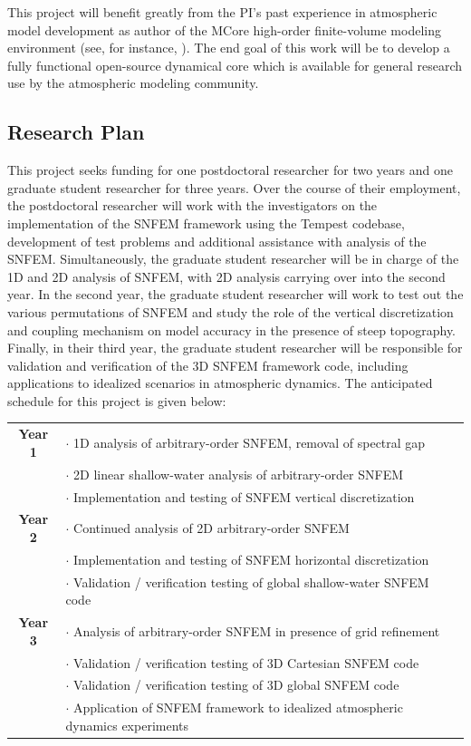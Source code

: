 \documentclass[11pt]{article}
\begin{document}
This project will benefit greatly from the PI's past experience in atmospheric model development as author of the MCore high-order finite-volume modeling environment (see, for instance, \cite{PAUCJBVL2010JCP,PAUCJ2012MWR,PAUCJ2012JCP}).  The end goal of this work will be to develop a fully functional open-source dynamical core which is available for general research use by the atmospheric modeling community.

\subsection{Research Plan} \label{sec:ResearchPlan}

This project seeks funding for one postdoctoral researcher for two years and one graduate student researcher for three years.  Over the course of their employment, the postdoctoral researcher will work with the investigators on the implementation of the SNFEM framework using the Tempest codebase, development of test problems and additional assistance with analysis of the SNFEM.  Simultaneously, the graduate student researcher will be in charge of the 1D and 2D analysis of SNFEM, with 2D analysis carrying over into the second year.  In the second year, the graduate student researcher will work to test out the various permutations of SNFEM and study the role of the vertical discretization and coupling mechanism on model accuracy in the presence of steep topography.  Finally, in their third year, the graduate student researcher will be responsible for validation and verification of the 3D SNFEM framework code, including applications to idealized scenarios in atmospheric dynamics.  The anticipated schedule for this project is given below:

\begin{tabularx}{\textwidth}{cX}
\hline
\textbf{Year 1} & $\cdot$ 1D analysis of arbitrary-order SNFEM, removal of spectral gap \\
& $\cdot$ 2D linear shallow-water analysis of arbitrary-order SNFEM \\
& $\cdot$ Implementation and testing of SNFEM vertical discretization \\
\hline
\textbf{Year 2} & $\cdot$ Continued analysis of 2D arbitrary-order SNFEM \\
& $\cdot$ Implementation and testing of SNFEM horizontal discretization \\
& $\cdot$ Validation / verification testing of global shallow-water SNFEM code \\
\hline
\textbf{Year 3} & $\cdot$ Analysis of arbitrary-order SNFEM in presence of grid refinement \\
& $\cdot$ Validation / verification testing of 3D Cartesian SNFEM code \\
& $\cdot$ Validation / verification testing of 3D global SNFEM code \\
& $\cdot$ Application of SNFEM framework to idealized atmospheric dynamics experiments \\
\hline
\end{tabularx}
\end{document}
